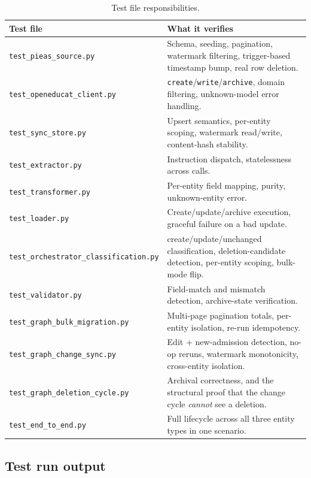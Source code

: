 \documentclass[11pt,a4paper]{article}
\begin{document}
\begin{table}[H]
\centering
\small
\begin{tabular}{@{}p{6.9cm}p{7.0cm}@{}}
\toprule
\textbf{Test file} & \textbf{What it verifies} \\
\midrule
\texttt{test\_pieas\_source.py} & Schema, seeding, pagination, watermark filtering, trigger-based
timestamp bump, real row deletion. \\
\texttt{test\_openeducat\_client.py} & \texttt{create}/\texttt{write}/\texttt{archive}, domain
filtering, unknown-model error handling. \\
\texttt{test\_sync\_store.py} & Upsert semantics, per-entity scoping, watermark read/write,
content-hash stability. \\
\texttt{test\_extractor.py} & Instruction dispatch, statelessness across calls. \\
\texttt{test\_transformer.py} & Per-entity field mapping, purity, unknown-entity error. \\
\texttt{test\_loader.py} & Create/update/archive execution, graceful failure on a bad update. \\
\texttt{test\_orchestrator\_classification.py} & create/update/unchanged classification,
deletion-candidate detection, per-entity scoping, bulk-mode flip. \\
\texttt{test\_validator.py} & Field-match and mismatch detection, archive-state verification. \\
\texttt{test\_graph\_bulk\_migration.py} & Multi-page pagination totals, per-entity isolation,
re-run idempotency. \\
\texttt{test\_graph\_change\_sync.py} & Edit + new-admission detection, no-op reruns, watermark
monotonicity, cross-entity isolation. \\
\texttt{test\_graph\_deletion\_cycle.py} & Archival correctness, and the structural proof that
the change cycle \textit{cannot} see a deletion. \\
\texttt{test\_end\_to\_end.py} & Full lifecycle across all three entity types in one scenario. \\
\bottomrule
\end{tabular}
\caption{Test file responsibilities.}
\end{table}

\subsection{Test run output}
\end{document}
